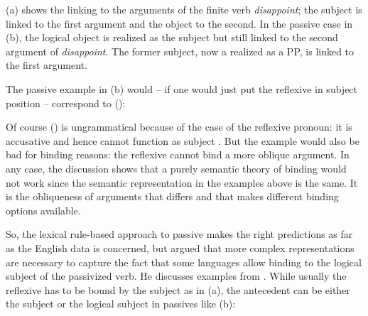 \documentclass[output=paper
 	        ,biblatex
                ,babelshorthands
                ,newtxmath
                ,draftmode
                ,colorlinks, citecolor=brown
]{langscibook}
\begin{document}
{\jamwidth=5cm
\eal
{}
\zl
(a) shows the linking to the arguments of the finite verb \emph{disappoint}; the subject is
linked to the first argument and the object to the second. In the passive case in (b), the
logical object is realized as the subject but still linked to the second argument of
\emph{disappoint}. The former subject, now a realized as a PP, is linked to the first argument. 

The passive example in (b) would -- if one would just put the reflexive in subject position
-- correspond to ():
\z
}

\noindent
Of course () is ungrammatical because of the case of the reflexive pronoun: it is accusative
and hence cannot function as subject \citep[]{Brame77}. But the example would also be bad for binding reasons: the
reflexive cannot bind a more oblique argument. In any case, the discussion shows that a purely
semantic theory of binding would not work since the semantic representation in the examples above is
the same. It is the obliqueness of arguments that differs and that makes different binding options available.

So, the lexical rule-based approach to passive makes the right predictions as far as the English
data is concerned, but \citet{Perlmutter1984} argued that more complex representations are necessary to capture the
fact that some languages allow binding to the logical subject of the passivized verb. He discusses
examples from . While usually the reflexive has to be bound by the subject as in
(a), the antecedent can be either the subject or the logical subject in passives like (b):
\end{document}
